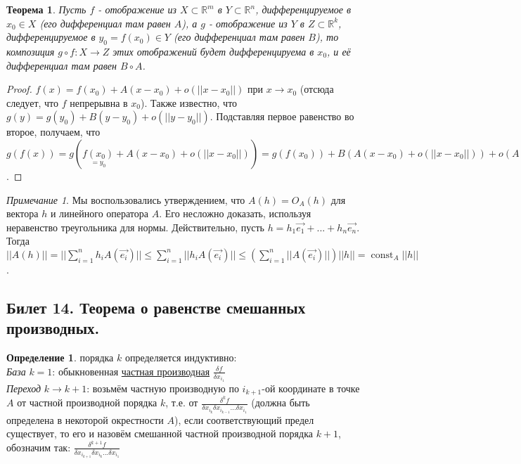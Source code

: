\documentclass[a4paper]{article}
\theoremstyle{indented}
\newtheorem{theorem}{Теорема}
\theoremstyle{definition}
\newtheorem{defn}{Определение}
\theoremstyle{remark}
\newtheorem{remark}{Примечание}
\DeclareMathOperator{\ra}{\rightarrow}
\DeclareMathOperator{\const}{const}
\begin{document}
\begin{theorem}
    Пусть $f$ - отображение из $X \subset \mathbb{R}^m$ в $Y \subset \mathbb{R}^n$, дифференцируемое в $x_0 \in X$ (его дифференциал там равен $A$), а $g$ - отображение из $Y$ в $Z \subset \mathbb{R}^k$, дифференцируемое в $y_0=f(x_0) \in Y$ (его дифференциал там равен $B$), то композиция $g \circ f: X \ra Z$ этих отображений будет дифференцируема в $x_0$, и её дифференциал там равен $B \circ A$.
\end{theorem}
\begin{proof}
    $f(x)=f(x_0)+A(x-x_0)+o(||x-x_0||)$ при $x \ra x_0$ (отсюда следует, что $f$ непрерывна в $x_0$). Также известно, что $g(y)=g(y_0)+B(y-y_0)+o(||y-y_0||)$. Подставляя первое равенство во второе, получаем, что $g(f(x))=g(\underset{=y_0}{f(x_0)}+A(x-x_0)+o(||x-x_0||))=g(f(x_0))+B(A(x-x_0)+o(||x-x_0||))+o(A(x-x_0)+o(||x-x_0||))=g(f(x_0))+BA(x-x_0)+o(||x-x_0||)$.
\end{proof}
\begin{remark}
    Мы воспользовались утверждением, что $A(h)=O_A(h)$ для вектора $h$ и линейного оператора $A$. Его несложно доказать, используя неравенство треугольника для нормы. Действительно, пусть $h=h_1\vec{e_1}+...+h_n\vec{e_n}$. Тогда $||A(h)||=||\sum_{i=1}^n h_i A(\vec{e_i})|| \leq \sum_{i=1}^n ||h_iA(\vec{e_i})|| \leq (\sum_{i=1}^n ||A(\vec{e_i})||) ||h||=\const_A ||h||$.
\end{remark}

\subsection{Билет 14. Теорема о равенстве смешанных производных.}
\begin{defn}
     порядка $k$ определяется индуктивно:\\
    \textit{База} $k=1$: обыкновенная \hyperlink{partial der}{частная производная} $\frac{\delta f}{\delta x_{i_1}}$\\
    \textit{Переход} $k\to k+1$: возьмём частную производную по $i_{k+1}$-ой координате в точке $A$ от частной производной порядка $k$, т.е.
    от $\frac{\delta^k f}{\delta x_{i_k}\delta x_{i_{k-1}}...\delta x_{i_1}}$ (должна быть определена в некоторой окрестности
    $A$), если соответствующий предел существует, то его и назовём смешанной частной производной порядка $k+1$, обозначим так:
    $\frac{\delta^{k+1} f}{\delta x_{i_{k+1}}\delta x_{i_k}...\delta x_{i_1}}$
\end{defn}
\end{document}
